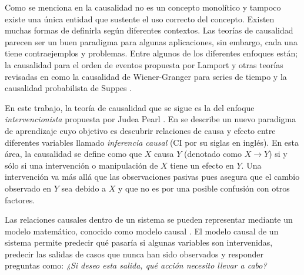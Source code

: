 Como se menciona en \cite{theoryofcausalities2006} 
la causalidad no es un concepto monolítico y tampoco
existe una única entidad que sustente el uso correcto
del concepto. Existen muchas formas de definirla según diferentes contextos. Las teorías de causalidad
parecen ser un buen paradigma para algunas aplicaciones,
sin embargo, cada una tiene contraejemplos y problemas.
Entre algunos de los diferentes enfoques 
están; la causalidad para
el orden de eventos propuesta por Lamport \cite{lamport2019time} y otras teorías revisadas en
\cite{holland1986statistics} como la causalidad de Wiener-Granger para
series de tiempo \cite{granger1969investigating} y la 
causalidad probabilista de Suppes \cite{suppes1973probabilistic}. 

En este trabajo, la teoría
de causalidad que se sigue es la del enfoque \textit{intervencionista} propuesta
por Judea Pearl \cite{pearl2010introduction} \cite{sep-causal-models}.
En \cite{pearl2018bookofwhy} se describe un
nuevo paradigma de aprendizaje cuyo objetivo es descubrir relaciones de causa y efecto entre diferentes variables llamado \textit{inferencia causal} (CI por su siglas en inglés).
En esta área, la causalidad se define
como que $X$ causa $Y$ (denotado como $X \rightarrow Y$) si
y sólo si una intervención 
o manipulación de $X$ tiene un 
efecto en $Y$\cite{doi:10.1063/1.5025050}.
Una intervención va más allá que las observaciones pasivas pues asegura que el cambio
observado en $Y$ sea debido a $X$ y que no
es por una posible confusión con otros factores.

Las relaciones causales dentro de un sistema se pueden representar mediante un modelo matemático, conocido como modelo causal \cite{sep-causal-models}.
El modelo causal de un sistema
permite predecir qué pasaría si algunas
variables son intervenidas, predecir las salidas de casos que nunca han sido observados \cite{chaochao_2019} y responder preguntas como:
\textit{¿Si deseo esta salida, qué acción necesito
llevar a cabo?}











